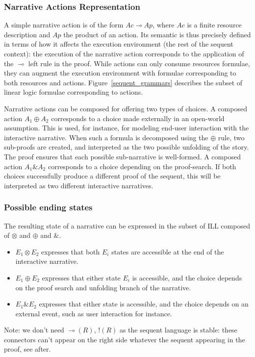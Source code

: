 \documentclass[runningheads,a4paper]{llncs}
\begin{document}
\subsubsection{Narrative Actions Representation}
A simple narrative action is of the form $Ac \multimap Ap$, where $Ac$ is a finite resource description and $Ap$ the product of an action. Its semantic is thus precisely defined in terms of how it affects the execution environment (the rest of the sequent context): the execution of the narrative action corresponds to the application of the $\multimap$ left rule in the proof. While actions can only consume resources formulae, they can augment the execution environment with formulae corresponding to both resources and actions. Figure~\ref{sequent_grammars} describes the subset of linear logic formulae corresponding to actions.

Narrative actions can be composed for offering two types of choices. A composed action $A_{1} \oplus A_{2}$ corresponds to a choice made externally in an open-world assumption. This is used, for instance, for modeling end-user interaction with the interactive narrative. When such a formula is decomposed using the $\oplus$ rule, two sub-proofs are created, and interpreted as the two possible unfolding of the story. The proof ensures that each possible sub-narrative is well-formed. A composed action $A_{1} \& A_{2}$ corresponds to a choice depending on the proof-search. If both choices successfully produce a different proof of the sequent, this will be interpreted as two different interactive narratives.
\subsubsection{Possible ending states}
The resulting state of a narrative can be expressed in the subset of ILL composed of $\otimes$ and $\oplus$ and $\&$. 
\begin{itemize}
\item $E_{1} \otimes E_{2}$ expresses that both $E_{i}$ states are accessible at the end of the interactive narrative.
\item $E_{1} \oplus E_{2}$ expresses that either state $E_{i}$ is accessible, and the choice depends on the proof search and unfolding branch of the narrative.
\item $E_{1} \& E_{2}$ expresses that either state is accessible, and the choice depends on an external event, such as user interaction for instance. 
\end{itemize}
Note: we don't need $\multimap (R)$, $! (R)$ as the sequent language is stable: these connectors can't appear on the right side whatever the sequent appearing in the proof, see after.
\end{document}
